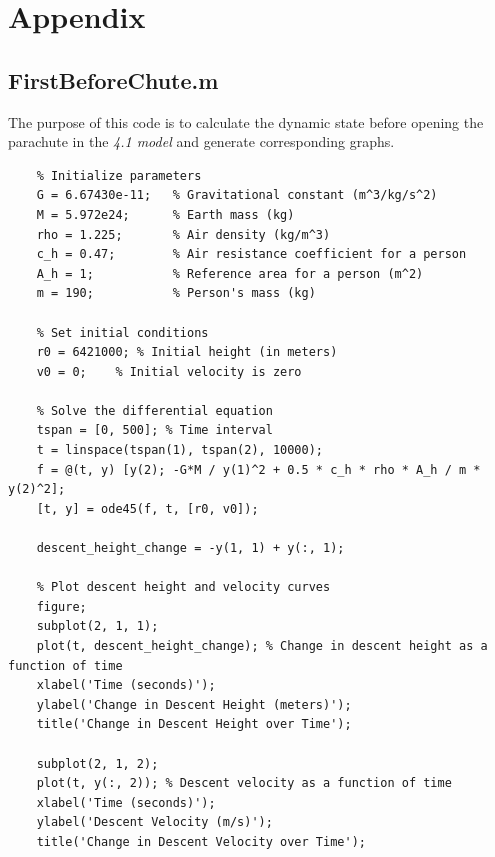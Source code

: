 \documentclass[12pt]{article}
\begin{document}
\section{Appendix}


\subsection{FirstBeforeChute.m}
The purpose of this code is to calculate the dynamic state before opening the parachute 
in the \textit{4.1 model} and generate corresponding graphs.
\begin{lstlisting}
    % Initialize parameters
    G = 6.67430e-11;   % Gravitational constant (m^3/kg/s^2)
    M = 5.972e24;      % Earth mass (kg)
    rho = 1.225;       % Air density (kg/m^3)
    c_h = 0.47;        % Air resistance coefficient for a person
    A_h = 1;           % Reference area for a person (m^2)
    m = 190;           % Person's mass (kg)

    % Set initial conditions
    r0 = 6421000; % Initial height (in meters)
    v0 = 0;    % Initial velocity is zero

    % Solve the differential equation
    tspan = [0, 500]; % Time interval
    t = linspace(tspan(1), tspan(2), 10000);
    f = @(t, y) [y(2); -G*M / y(1)^2 + 0.5 * c_h * rho * A_h / m * y(2)^2];
    [t, y] = ode45(f, t, [r0, v0]);

    descent_height_change = -y(1, 1) + y(:, 1);

    % Plot descent height and velocity curves
    figure;
    subplot(2, 1, 1);
    plot(t, descent_height_change); % Change in descent height as a function of time
    xlabel('Time (seconds)');
    ylabel('Change in Descent Height (meters)');
    title('Change in Descent Height over Time');

    subplot(2, 1, 2);
    plot(t, y(:, 2)); % Descent velocity as a function of time
    xlabel('Time (seconds)');
    ylabel('Descent Velocity (m/s)');
    title('Change in Descent Velocity over Time');
\end{lstlisting}
\end{document}
